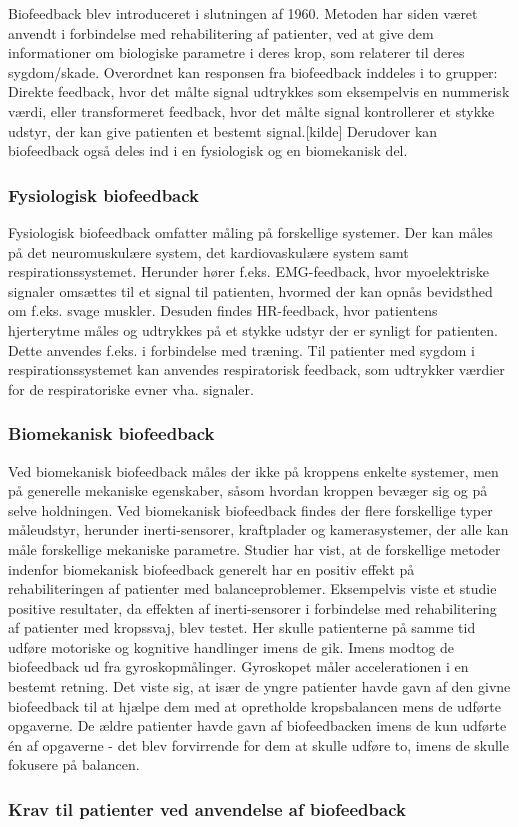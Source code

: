 Biofeedback blev introduceret i slutningen af 1960. Metoden har siden været anvendt i forbindelse med rehabilitering af patienter, ved at give dem informationer om biologiske parametre i deres krop, som relaterer til deres sygdom/skade. 
Overordnet kan responsen fra biofeedback inddeles i to grupper: Direkte feedback, hvor det målte signal udtrykkes som eksempelvis en nummerisk værdi, eller transformeret feedback, hvor det målte signal kontrollerer et stykke udstyr, der kan give patienten et bestemt signal.[kilde] 
Derudover kan biofeedback også deles ind i en fysiologisk og en biomekanisk del.

\subsubsection{Fysiologisk biofeedback}
Fysiologisk biofeedback omfatter måling på forskellige systemer. Der kan måles på det neuromuskulære system, det kardiovaskulære system samt respirationssystemet. 
Herunder hører f.eks. EMG-feedback, hvor myoelektriske signaler omsættes til et signal til patienten, hvormed der kan opnås bevidsthed om f.eks. svage muskler. Desuden findes HR-feedback, hvor patientens hjerterytme måles og udtrykkes på et stykke udstyr der er synligt for patienten. Dette anvendes f.eks. i forbindelse med træning. Til patienter med sygdom i respirationssystemet kan anvendes respiratorisk feedback, som udtrykker værdier for de respiratoriske evner vha. signaler.

\subsubsection{Biomekanisk biofeedback}
Ved biomekanisk biofeedback måles der ikke på kroppens enkelte systemer, men på generelle mekaniske egenskaber, såsom hvordan kroppen bevæger sig og på selve holdningen.  
Ved biomekanisk biofeedback findes der flere forskellige typer måleudstyr, herunder inerti-sensorer, kraftplader og kamerasystemer, der alle kan måle forskellige mekaniske parametre. Studier har vist, at de forskellige metoder indenfor biomekanisk biofeedback generelt har en positiv effekt på rehabiliteringen af patienter med balanceproblemer. Eksempelvis viste et studie positive resultater, da effekten af inerti-sensorer i forbindelse med rehabilitering af patienter med kropssvaj, blev testet. Her skulle patienterne på samme tid udføre motoriske og kognitive handlinger imens de gik. Imens modtog de biofeedback ud fra gyroskopmålinger. Gyroskopet måler accelerationen i en bestemt retning\cite{Hjaelpemiddelbasen}. Det viste sig, at især de yngre patienter havde gavn af den givne biofeedback til at hjælpe dem med at opretholde kropsbalancen mens de udførte opgaverne. De ældre patienter havde gavn af biofeedbacken imens de kun udførte én af opgaverne - det blev forvirrende for dem at skulle udføre to, imens de skulle fokusere på balancen. 

\subsubsection{Krav til patienter ved anvendelse af biofeedback}



 


